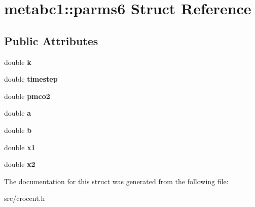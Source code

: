 \hypertarget{structmetabc1_1_1parms6}{\section{metabc1\-:\-:parms6 Struct Reference}
\label{structmetabc1_1_1parms6}
}
\subsection*{Public Attributes}
\begin{DoxyCompactItemize}
\item 
\hypertarget{structmetabc1_1_1parms6_a5398fd04760d1d6fb0bba8b56bc9ab82}{double {\bfseries k}}\label{structmetabc1_1_1parms6_a5398fd04760d1d6fb0bba8b56bc9ab82}

\item 
\hypertarget{structmetabc1_1_1parms6_a0a9936185dbd65e64878c77c55a4de43}{double {\bfseries timestep}}\label{structmetabc1_1_1parms6_a0a9936185dbd65e64878c77c55a4de43}

\item 
\hypertarget{structmetabc1_1_1parms6_a81845edb5f5275abeea83cda739033e7}{double {\bfseries pmco2}}\label{structmetabc1_1_1parms6_a81845edb5f5275abeea83cda739033e7}

\item 
\hypertarget{structmetabc1_1_1parms6_a7810eb99d5d01c641d669c4a11787c97}{double {\bfseries a}}\label{structmetabc1_1_1parms6_a7810eb99d5d01c641d669c4a11787c97}

\item 
\hypertarget{structmetabc1_1_1parms6_aac239fb68acef4dbf846c55f5baeb227}{double {\bfseries b}}\label{structmetabc1_1_1parms6_aac239fb68acef4dbf846c55f5baeb227}

\item 
\hypertarget{structmetabc1_1_1parms6_ad9f31b7edadefcc69cf5d2a1b8ddd823}{double {\bfseries x1}}\label{structmetabc1_1_1parms6_ad9f31b7edadefcc69cf5d2a1b8ddd823}

\item 
\hypertarget{structmetabc1_1_1parms6_aa63d5f0114a0e23aacc29a82c195833f}{double {\bfseries x2}}\label{structmetabc1_1_1parms6_aa63d5f0114a0e23aacc29a82c195833f}

\end{DoxyCompactItemize}


The documentation for this struct was generated from the following file\-:\begin{DoxyCompactItemize}
\item 
src/crocent.\-h\end{DoxyCompactItemize}
